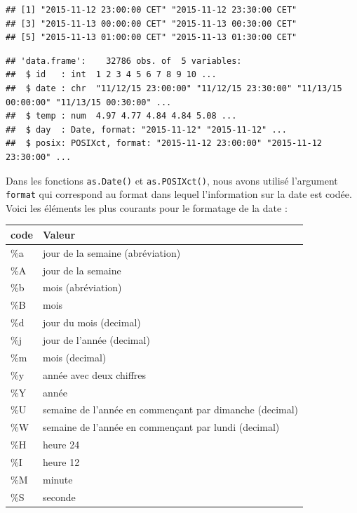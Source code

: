 \documentclass[]{book}
\newenvironment{Shaded}{\begin{snugshade}}{\end{snugshade}}
\newcommand{\DataTypeTok}[1]{\textcolor[rgb]{0.13,0.29,0.53}{#1}}
\newcommand{\KeywordTok}[1]{\textcolor[rgb]{0.13,0.29,0.53}{\textbf{#1}}}
\newcommand{\NormalTok}[1]{#1}
\newcommand{\OperatorTok}[1]{\textcolor[rgb]{0.81,0.36,0.00}{\textbf{#1}}}
\newcommand{\StringTok}[1]{\textcolor[rgb]{0.31,0.60,0.02}{#1}}
\begin{document}
\begin{Shaded}
\end{Shaded}

\begin{verbatim}
## [1] "2015-11-12 23:00:00 CET" "2015-11-12 23:30:00 CET"
## [3] "2015-11-13 00:00:00 CET" "2015-11-13 00:30:00 CET"
## [5] "2015-11-13 01:00:00 CET" "2015-11-13 01:30:00 CET"
\end{verbatim}

\begin{Shaded}
\end{Shaded}

\begin{verbatim}
## 'data.frame':    32786 obs. of  5 variables:
##  $ id   : int  1 2 3 4 5 6 7 8 9 10 ...
##  $ date : chr  "11/12/15 23:00:00" "11/12/15 23:30:00" "11/13/15 00:00:00" "11/13/15 00:30:00" ...
##  $ temp : num  4.97 4.77 4.84 4.84 5.08 ...
##  $ day  : Date, format: "2015-11-12" "2015-11-12" ...
##  $ posix: POSIXct, format: "2015-11-12 23:00:00" "2015-11-12 23:30:00" ...
\end{verbatim}

Dans les fonctions \texttt{as.Date()} et \texttt{as.POSIXct()}, nous avons utilisé l'argument \texttt{format} qui correspond au format dans lequel l'information sur la date est codée. Voici les éléments les plus courants pour le formatage de la date :

\begin{longtable}[]{@{}ll@{}}
\toprule
code & Valeur\tabularnewline
\midrule
\endhead
\%a & jour de la semaine (abréviation)\tabularnewline
\%A & jour de la semaine\tabularnewline
\%b & mois (abréviation)\tabularnewline
\%B & mois\tabularnewline
\%d & jour du mois (decimal)\tabularnewline
\%j & jour de l'année (decimal)\tabularnewline
\%m & mois (decimal)\tabularnewline
\%y & année avec deux chiffres\tabularnewline
\%Y & année\tabularnewline
\%U & semaine de l'année en commençant par dimanche (decimal)\tabularnewline
\%W & semaine de l'année en commençant par lundi (decimal)\tabularnewline
\%H & heure 24\tabularnewline
\%I & heure 12\tabularnewline
\%M & minute\tabularnewline
\%S & seconde\tabularnewline
\bottomrule
\end{longtable}
\end{document}

